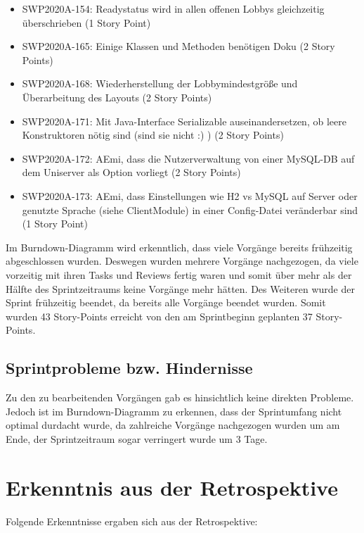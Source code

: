 \documentclass[12pt,a4paper, oneside]{article}
\begin{document}
    \begin{itemize}
        \item SWP2020A-154: Readystatus wird in allen offenen Lobbys gleichzeitig überschrieben    (1 Story Point)

        \item SWP2020A-165: Einige Klassen und Methoden benötigen Doku (2 Story Points)

        \item SWP2020A-168: Wiederherstellung der Lobbymindestgröße und Überarbeitung des Layouts (2 Story Points)

        \item SWP2020A-171: Mit Java-Interface Serializable auseinandersetzen, ob leere Konstruktoren nötig sind (sind sie nicht :) )    (2 Story Points)

        \item SWP2020A-172: AEmi, dass die Nutzerverwaltung von einer MySQL-DB auf dem Uniserver als Option vorliegt (2 Story Points)


        \item SWP2020A-173: AEmi, dass Einstellungen wie H2 vs MySQL auf Server oder genutzte Sprache (siehe ClientModule) in einer Config-Datei veränderbar sind (1 Story Point)

    \end{itemize}

    Im Burndown-Diagramm wird erkenntlich, dass viele Vorgänge bereits frühzeitig abgeschlossen wurden. Deswegen wurden mehrere Vorgänge nachgezogen, da viele vorzeitig mit ihren Tasks und Reviews fertig waren und somit über mehr als der Hälfte des Sprintzeitraums keine Vorgänge mehr hätten. Des Weiteren wurde der Sprint frühzeitig beendet, da bereits alle Vorgänge beendet wurden. Somit wurden 43 Story-Points erreicht von den am Sprintbeginn geplanten 37 Story-Points.

    \subsection{Sprintprobleme bzw. Hindernisse}
    Zu den zu bearbeitenden Vorgängen gab es hinsichtlich keine direkten Probleme. Jedoch ist im Burndown-Diagramm zu erkennen, dass der Sprintumfang nicht optimal durdacht wurde, da zahlreiche Vorgänge nachgezogen wurden um am Ende, der Sprintzeitraum sogar verringert wurde um 3 Tage.


    \section{Erkenntnis aus der Retrospektive}
    Folgende Erkenntnisse ergaben sich aus der Retrospektive:\\
\end{document}
